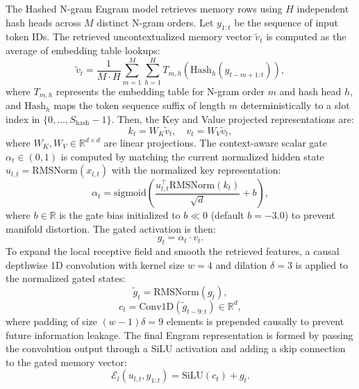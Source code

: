 \documentclass[preprint,12pt]{elsarticle}
\newcommand{\Eng}{\mathcal{E}}
\newcommand{\RMS}{\mathrm{RMSNorm}}
\newcommand{\sigmoid}{\mathrm{sigmoid}}
\begin{document}
The Hashed N-gram Engram model retrieves memory rows using $H$ independent hash heads across $M$ distinct N-gram orders. Let $y_{1:t}$ be the sequence of input token IDs. The retrieved uncontextualized memory vector $\tilde{v}_t$ is computed as the average of embedding table lookups:
\begin{equation}
\tilde{v}_t = \frac{1}{M \cdot H} \sum_{m=1}^M \sum_{h=1}^H T_{m,h}(\text{Hash}_h(y_{t-m+1:t})),
\end{equation}
where $T_{m,h}$ represents the embedding table for N-gram order $m$ and hash head $h$, and $\text{Hash}_h$ maps the token sequence suffix of length $m$ deterministically to a slot index in $\{0, \ldots, S_{\text{hash}}-1\}$.
Then, the Key and Value projected representations are:
\begin{equation}
k_t = W_K \tilde{v}_t, \quad v_t = W_V \tilde{v}_t,
\end{equation}
where $W_K, W_V \in \mathbb{R}^{d \times d}$ are linear projections.
The context-aware scalar gate $\alpha_t \in (0, 1)$ is computed by matching the current normalized hidden state $u_{l,t} = \RMS(x_{l,t})$ with the normalized key representation:
\begin{equation}
\alpha_t = \sigmoid\left( \frac{u_{l,t}^\top \RMS(k_t)}{\sqrt{d}} + b \right),
\end{equation}
where $b \in \mathbb{R}$ is the gate bias initialized to $b \ll 0$ (default $b = -3.0$) to prevent manifold distortion.
The gated activation is then:
\begin{equation}
g_t = \alpha_t \cdot v_t.
\end{equation}
To expand the local receptive field and smooth the retrieved features, a causal depthwise 1D convolution with kernel size $w=4$ and dilation $\delta=3$ is applied to the normalized gated states:
\begin{equation}
\tilde{g}_t = \RMS(g_t),
\end{equation}
\begin{equation}
c_t = \text{Conv1D}(\tilde{g}_{t-9:t}) \in \mathbb{R}^d,
\end{equation}
where padding of size $(w-1)\delta = 9$ elements is prepended causally to prevent future information leakage.
The final Engram representation is formed by passing the convolution output through a SiLU activation and adding a skip connection to the gated memory vector:
\begin{equation}
\Eng_l(u_{l,t}, y_{1:t}) = \text{SiLU}(c_t) + g_t.
\end{equation}
\end{document}
